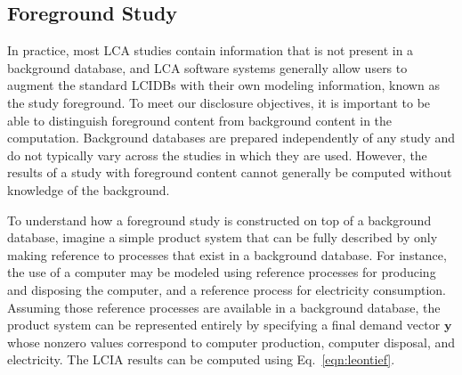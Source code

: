 \subsection{Foreground Study}

In practice, most LCA studies contain information that is not present in a background database, and LCA software systems generally allow users to augment the standard LCIDBs with their own modeling information, known as the study foreground.  To meet our disclosure objectives, it is important to be able to distinguish foreground content from background content in the computation.  Background databases are prepared independently of any study and do not typically vary across the studies in which they are used.  However, the results of a study with foreground content cannot generally be computed without knowledge of the background.  %

To understand how a foreground study is constructed on top of a background database, imagine a simple product system that can be fully described by only making reference to processes that exist in a background database.  For instance, the use of a computer may be modeled using reference processes for producing and disposing the computer, and a reference process for electricity consumption.  Assuming those reference processes are available in a background database, the product system can be represented entirely by specifying a final demand vector $\mathbf{y}$ whose nonzero values correspond to computer production, computer disposal, and electricity.  The LCIA results can be computed using Eq.~\ref{eqn:leontief}.

